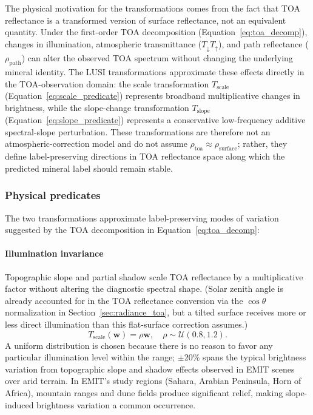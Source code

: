 \documentclass[preprint,12pt]{elsarticle}
\begin{document}
The physical motivation for the transformations comes from the fact that TOA reflectance is a transformed version of surface reflectance, not an equivalent quantity. Under the first-order TOA decomposition (Equation~\ref{eq:toa_decomp}), changes in illumination, atmospheric transmittance ($T_{\downarrow} T_{\uparrow}$), and path reflectance ($\rho_{\mathrm{path}}$) can alter the observed TOA spectrum without changing the underlying mineral identity. The LUSI transformations approximate these effects directly in the TOA-observation domain: the scale transformation $T_{\text{scale}}$ (Equation~\ref{eq:scale_predicate}) represents broadband multiplicative changes in brightness, while the slope-change transformation $T_{\text{slope}}$ (Equation~\ref{eq:slope_predicate}) represents a conservative low-frequency additive spectral-slope perturbation. These transformations are therefore not an atmospheric-correction model and do not assume $\rho_{\mathrm{toa}} \approx \rho_{\mathrm{surface}}$; rather, they define label-preserving directions in TOA reflectance space along which the predicted mineral label should remain stable.

\subsubsection{Physical predicates}
\label{sec:lusi_predicates}

The two transformations approximate label-preserving modes of variation suggested by the TOA decomposition in Equation~\ref{eq:toa_decomp}:

\paragraph{Illumination invariance}
Topographic slope and partial shadow scale TOA reflectance by a multiplicative factor without altering the diagnostic spectral shape. (Solar zenith angle is already accounted for in the TOA reflectance conversion via the $\cos\theta$ normalization in Section~\ref{sec:radiance_toa}, but a tilted surface receives more or less direct illumination than this flat-surface correction assumes.)
\begin{equation}
T_{\text{scale}}(\mathbf{w}) = \rho \mathbf{w}, \quad \rho \sim \mathcal{U}(0.8, 1.2).
\label{eq:scale_predicate}
\end{equation}
A uniform distribution is chosen because there is no reason to favor any particular illumination level within the range; $\pm$20\% spans the typical brightness variation from topographic slope and shadow effects observed in EMIT scenes over arid terrain. In EMIT's study regions (Sahara, Arabian Peninsula, Horn of Africa), mountain ranges and dune fields produce significant relief, making slope-induced brightness variation a common occurrence.
\end{document}
